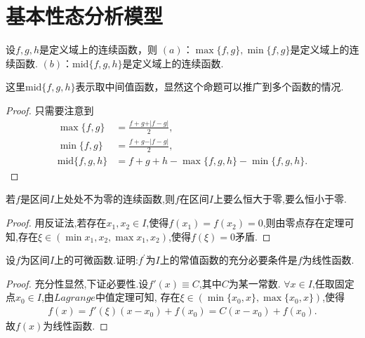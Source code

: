 \documentclass[../../main.tex]{subfiles}
\begin{document}
\section{基本性态分析模型}

\begin{proposition}[多个函数取最值或者中间值]\label{proposition:多个函数取最值或者中间值}
设\(f,g,h\)是定义域上的连续函数，则
\((a)\)：\(\max\{f,g\}, \min\{f,g\}\)是定义域上的连续函数.
\((b)\)：\(\text{mid}\{f,g,h\}\)是定义域上的连续函数.
\end{proposition}
\begin{remark}
这里\(\text{mid}\{f,g,h\}\)表示取中间值函数，显然这个命题可以推广到多个函数的情况.
\end{remark}
\begin{proof}
只需要注意到
\begin{align*}
\max\{f,g\}&=\frac{f + g+\vert f - g\vert}{2},\\
\min\{f,g\}&=\frac{f + g-\vert f - g\vert}{2},\\
\text{mid}\{f,g,h\}&=f + g + h-\max\{f,g,h\}-\min\{f,g,h\}.
\end{align*}
\end{proof}

\begin{proposition}\label{proposition:连续函数无零点则一定恒大于零或恒小于零}
若\(f\)是区间\(I\)上处处不为零的连续函数,则\(f\)在区间\(I\)上要么恒大于零,要么恒小于零.
\end{proposition}
\begin{proof}
用反证法,若存在$x_1,x_2\in I$,使得$f(x_1)=f(x_2)=0$,则由零点存在定理可知,存在$\xi \in (\min{x_1,x_2},\max{x_1,x_2})$,使得$f(\xi)=0$矛盾.
\end{proof}

\begin{proposition}\label{proposition:导数为常数的函数必是线性函数}
设\(f\)为区间\(I\)上的可微函数.证明:\(f^{\prime}\)为\(I\)上的常值函数的充分必要条件是\(f\)为线性函数.
\end{proposition}
\begin{proof}
充分性显然,下证必要性.设$f'(x)\equiv C$,其中$C$为某一常数.
$\forall x\in I$,任取固定点$x_0\in I$,由$Lagrange$中值定理可知,
存在$\xi\in(\min\{x_0,x\},\max\{x_0,x\})$,使得
\begin{align*}
f(x)=f'(\xi)(x-x_0)+f(x_0)=C(x-x_0)+f(x_0).
\end{align*}
故$f(x)$为线性函数.
\end{proof}
\end{document}

